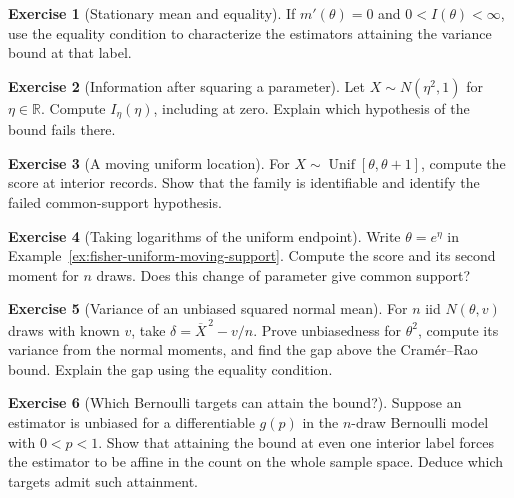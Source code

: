 \documentclass[11pt,oneside]{book}
\theoremstyle{definition}
\newtheorem{exercise}{Exercise}[section]
\theoremstyle{remark}
\newcommand{\R}{\mathbb R}
\begin{document}
\begin{exercise}[Stationary mean and equality]
\label{exer:fisher-zero-target-derivative}
If $m'(\theta)=0$ and $0<I(\theta)<\infty$, use the equality
condition to characterize the estimators attaining the
variance bound at that label.
\end{exercise}

\begin{exercise}[Information after squaring a parameter]
\label{exer:fisher-zero-information-reparameterization}
Let $X\sim N(\eta^2,1)$ for $\eta\in\R$. Compute $I_\eta(\eta)$,
including at zero. Explain which hypothesis of the bound
fails there.
\end{exercise}

\begin{exercise}[A moving uniform location]
\label{exer:fisher-uniform-location-score}
For $X\sim\operatorname{Unif}[\theta,\theta+1]$, compute the
score at interior records. Show that the family is identifiable
and identify the failed common-support hypothesis.
\end{exercise}

\begin{exercise}[Taking logarithms of the uniform endpoint]
\label{exer:fisher-uniform-endpoint-log-parameter}
Write $\theta=e^\eta$ in Example~\ref{ex:fisher-uniform-moving-support}.
Compute the score and its second moment for $n$ draws.
Does this change of parameter give common support?
\end{exercise}

\begin{exercise}[Variance of an unbiased squared normal mean]
\label{exer:cramer-rao-normal-square-gap}
For $n$ iid $N(\theta,v)$ draws with known $v$, take
$\delta=\overline X^{\,2}-v/n$. Prove unbiasedness for $\theta^2$,
compute its variance from the normal moments, and find the gap
above the Cram\'er--Rao bound. Explain the gap using the
equality condition.
\end{exercise}

\begin{exercise}[Which Bernoulli targets can attain the bound?]
\label{exer:cramer-rao-bernoulli-affine-targets}
Suppose an estimator is unbiased for a differentiable $g(p)$
in the $n$-draw Bernoulli model with $0<p<1$. Show that
attaining the bound at even one interior label forces the
estimator to be affine in the count on the whole sample space.
Deduce which targets admit such attainment.
\end{exercise}
\end{document}
